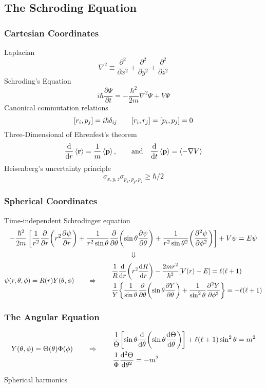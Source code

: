 \documentclass[a4paper,12pt]{article}
\begin{document}
\subsection{The Schroding Equation}
\subsubsection{Cartesian Coordinates}
Laplacian\[\nabla^2\equiv\frac{\partial^2}{\partial x^2}+
\frac{\partial^2}{\partial y^2}+\frac{\partial^2}{\partial z^2}\]
Schroding's Equation
\[i\hbar\frac{\partial\Psi}{\partial t} = -\frac{\hbar^2}{2m}\nabla^2\Psi+V\Psi\]
Canonical commutation relations
\[\comm{r_i}{p_j} = i\hbar\delta_{ij} \qquad \comm{r_i}{r_j}=\comm{p_i}{p_j}=0\]
Three-Dimensional of Ehrenfest's theorem
\[\dv{r}\expval{\mathbf{r}} = \frac{1}{m}\expval{\mathbf{p}},\qquad
\text{and} \quad \dv{t}\expval{\mathbf{p}}=\expval{-\nabla V}\]
Heisenberg's uncertainty principle
\[\sigma_{x,y,z}\sigma_{p_x,p_y,p_z}\geq\hbar/2\]
\subsubsection{Spherical Coordinates}
Time-independent Schrodinger equation
\[-\frac{\hbar^2}{2m}\left[\frac{1}{r^2}\pdv{r}(r^2\pdv{\psi}{r})+\frac{1}{r^2\sin\theta}\pdv{\theta}(\sin\theta\pdv{\psi}{\theta})+
\frac{1}{r^2\sin\theta^2}\qty(\pdv[2]{\psi}{\phi})\right] + V\psi=E\psi \]
\[\Downarrow\]
\[\psi(r,\theta,\phi)=R(r)Y(\theta,\phi)\qquad\Rightarrow\qquad\begin{aligned}
       &\frac{1}{R}\dv{r}(r^2\dv{R}{r}) - \frac{2mr^2}{\hbar^2}[V(r) - E] = \ell(\ell+1) \\
       &\frac{1}{Y}\qty{\frac{1}{\sin\theta}\pdv{\theta}(\sin\theta\pdv{Y}{\theta})+\frac{1}{\sin^2\theta}\pdv[2]{Y}{\phi}} = -\ell(\ell+1)
\end{aligned}\]
\subsubsection{The Angular Equation}

\[Y(\theta,\phi) = \Theta(\theta)\Phi(\phi) \qquad\Rightarrow\qquad
 \begin{aligned}
       &\frac{1}{\Theta}\qty[\sin\theta\dv{\theta}(\sin\theta\dv{\Theta}{\theta})] + 
       \ell(\ell+1)\sin^2\theta = m^2 \\
       &\frac{1}{\Phi}\dv[2]{\Theta}{\theta} = -m^2
 \end{aligned}\]

Spherical harmonics
\end{document}
